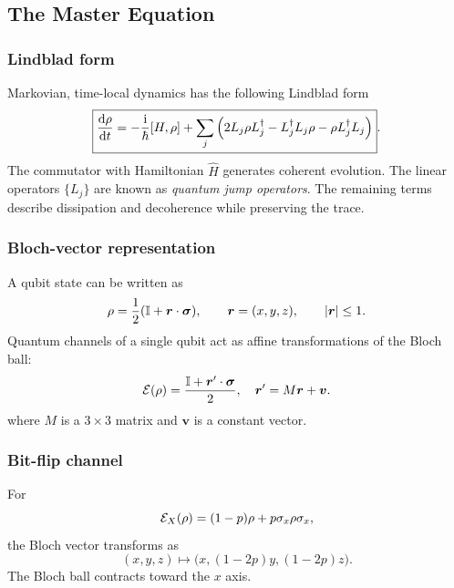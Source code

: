 \subsection{The Master Equation}

\subsubsection{Lindblad form}
Markovian, time-local dynamics has the following Lindblad form
\begin{equation}
 \boxed{
 \frac{\mathrm{d}\rho}{\mathrm{d} t}
 =-\frac{\hspace{1pt}\mathrm{i}\hspace{1pt}}{\hbar}[H,\rho]
 +\sum_j\left(2L_j\rho L_j^\dagger
 -L_j^\dagger L_j\rho-\rho L_j^\dagger L_j\right)}.
\end{equation}
The commutator with Hamiltonian $\hat H$ generates coherent evolution. The linear operators $\{L_j\}$ are known as \emph{quantum jump operators}. The remaining terms describe
dissipation and decoherence while preserving the trace.

\subsubsection{Bloch-vector representation}
A qubit state can be written as
\begin{equation}
 \rho=\frac12(\mathbb{I}+\bm r\cdot\bm\sigma),
 \qquad \bm r=(x,y,z),\qquad |\bm r|\leq1.
\end{equation}
Quantum channels of a single qubit act as affine transformations of the Bloch ball:
\begin{align}
    \mathcal{E}(\rho)=\frac{\mathbb{I}+\bm{r}^\prime\cdot\bm\sigma}{2},~~~\bm r^\prime=M\bm r+\bm v.
\end{align}
where $M$ is a $3\times3$ matrix and $\bm v$ is a constant vector. 

\subsubsection{Bit-flip channel}
For
\begin{equation}
 \mathcal{E}_X(\rho)=(1-p)\rho+p\sigma_x\rho\sigma_x,
\end{equation}
the Bloch vector transforms as
\begin{equation}
 (x,y,z)\longmapsto\bigl(x,(1-2p)y,(1-2p)z\bigr).
\end{equation}
The Bloch ball contracts toward the $x$ axis.

